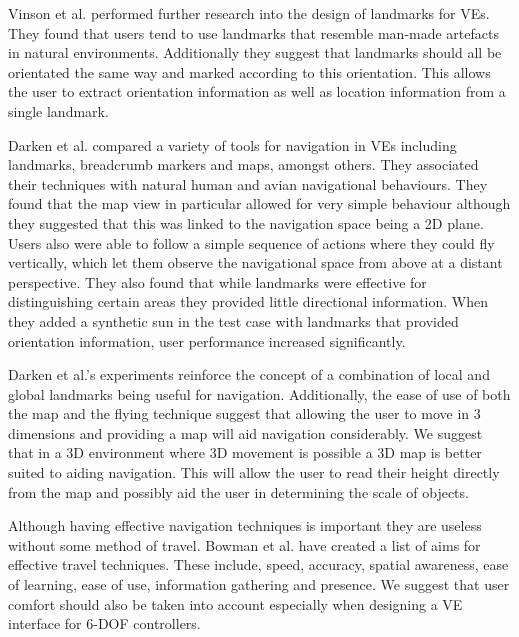 \documentclass{sig-alternate-05-2015}
\begin{document}
Vinson et al. performed further research into the design of landmarks for VEs.\cite{Vinson1999} They found that users tend to use landmarks that resemble man-made artefacts in natural environments. Additionally they suggest that landmarks should all be orientated the same way and marked according to this orientation. This allows the user to extract orientation information as well as location information from a single landmark.

Darken et al. compared a variety of tools for navigation in VEs including landmarks, breadcrumb markers and maps, amongst others\cite{Darken1993}. They associated their techniques with natural human and avian  navigational behaviours.  They found that the map view in particular allowed for very simple behaviour although they suggested that this was linked to the navigation space being a 2D plane. Users also were able to follow a simple sequence of actions where they could fly vertically, which let them observe the navigational space from above at a distant perspective. They also found that while landmarks were effective for distinguishing certain areas they provided little directional information. When they added a synthetic sun in the test case with landmarks that provided orientation information, user performance increased significantly. %

Darken et al.'s experiments reinforce the concept of a combination of local and global landmarks being useful for navigation\cite{Darken1993}. Additionally, the ease of use of both the map and the flying technique suggest that allowing the user to move in 3 dimensions and providing a map will aid navigation considerably. We suggest that in a 3D environment where 3D movement is possible a 3D map is better suited to aiding navigation. This will allow the user to read their height directly from the map and possibly aid the user in determining the scale of objects.

Although having effective navigation techniques is important they are useless without some method of travel. Bowman et al. have created a list of aims for effective travel techniques.\cite{Bowman1997} These include, speed, accuracy, spatial awareness, ease of learning, ease of use, information gathering and presence. We suggest that user comfort should also be taken into account especially when designing a VE interface for 6-DOF controllers.
\end{document}
